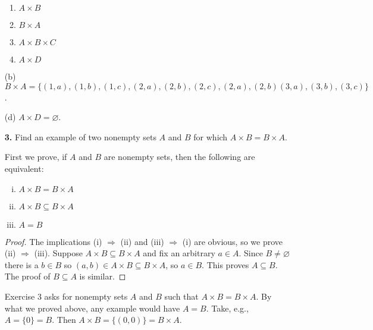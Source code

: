 \documentclass[12pt,reqno]{amsart}
\renewcommand{\emptyset}{\ensuremath{\varnothing}}
\begin{document}
\begin{enumerate}[{\bf 1.}]
\begin{multicols}{2}
\begin{enumerate}
\item
$A \times B$

\item
$B \times A$

\item
$A \times B \times C$

\item
$A \times D$

\end{enumerate}
\end{multicols}

\medskip


\medskip

(b) $B \times A = \{
(1,a), (1,b), (1,c),
(2,a), (2,b), (2,c), (2,a), (2,b)
(3,a), (3,b), (3,c)
\}$.

\medskip

(d) $A \times D = \emptyset$.

\bigskip  

\item[{\bf 3.}]
Find an example of two nonempty sets $A$ and $B$ for which $A \times B = B \times A$.

\medskip

 First we prove, if $A$ and $B$ are nonempty sets,
then the following are equivalent:  
\begin{enumerate}[(i)]
\item 
$A \times B = B \times A$
\item 
$A \times B \subseteq B \times A$
\item 
$A = B$
\end{enumerate}

\begin{proof}
The implications (i) $\Rightarrow$ (ii) and (iii) $\Rightarrow$ (i) are obvious,
so we prove (ii) $\Rightarrow$ (iii). Suppose 
$A \times B \subseteq B \times A$ and fix an arbitrary $a \in A$.
Since  $B \neq \emptyset$ there is a $b\in B$ so 
$(a,b) \in A\times B \subseteq B\times A$, so $a \in B$.  
This proves $A \subseteq B$.  
The proof of $B \subseteq A$ is similar.
\end{proof}

Exercise 3 asks for nonempty sets $A$ and $B$ such that
$A \times B = B \times A$.  By what we proved above, any example would have
$A = B$. Take, e.g., $A = \{0\} = B$.  Then $A \times B = \{(0,0)\} = B\times A$.

\bigskip



\end{enumerate}
\end{document}
